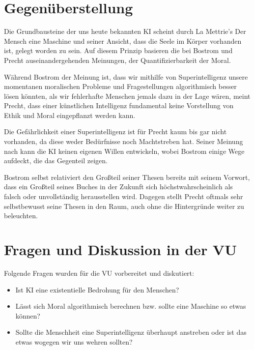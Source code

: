 \documentclass[twoside, a4paper, DIV=11, open=any, bibliography=totoc]{scrbook}
\newcommand{\Quote}[1]{\glqq #1\grqq{}}
\begin{document}

\section{Gegenüberstellung} \label{sec:litgegenueber}
Die Grundbausteine der uns heute bekannten KI scheint durch La Mettrie's \Quote{Der Mensch eine Maschine} und seiner Ansicht, dass die Seele im Körper vorhanden ist, gelegt worden zu sein. 
Auf diesem Prinzip basieren die bei Bostrom und Precht auseinandergehenden Meinungen, der Quantifizierbarkeit der Moral. 

Während Bostrom der Meinung ist, dass wir mithilfe von Superintelligenz unsere momentanen moralischen
Probleme und Fragestellungen algorithmisch besser lösen könnten, als wir fehlerhafte Menschen jemals dazu
in der Lage wären, meint Precht, dass einer künstlichen Intelligenz fundamental keine Vorstellung von
Ethik und Moral eingepflanzt werden kann.

Die Gefährlichkeit einer Superintelligenz ist für Precht kaum bis gar nicht vorhanden, da diese weder Bedürfnisse noch Machtstreben hat. Seiner Meinung nach kann die KI keinen eigenen Willen entwickeln, wobei Bostrom einige Wege aufdeckt, die das Gegenteil zeigen. 

Bostrom selbst relativiert den Großteil seiner Thesen bereits mit seinem Vorwort, dass ein Großteil seines
Buches in der Zukunft sich höchstwahrscheinlich als falsch oder unvollständig herausstellen wird.
Dagegen stellt Precht oftmals sehr selbstbewusst seine Thesen in den Raum, auch ohne die Hintergründe
weiter zu beleuchten.

\section{Fragen und Diskussion in der VU} \label{sec:fragenvu}

Folgende Fragen wurden für die VU vorbereitet und diskutiert:

\begin{itemize}
    \item Ist KI eine existentielle Bedrohung für den Menschen? 
    \item Lässt sich Moral algorithmisch berechnen bzw. sollte eine Maschine so etwas können? 
    \item Sollte die Menschheit eine Superintelligenz überhaupt anstreben oder ist das etwas wogegen wir uns wehren sollten?
\end{itemize}
\end{document}
